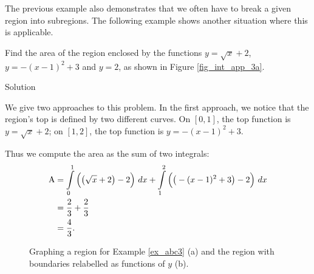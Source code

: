 The previous example also demonstrates that we often have to break a given region into subregions. The following example shows another situation where this is applicable.

\begin{example}\label{ex_abc3}
Find the area of the region enclosed by the functions $y=\sqrt{x}+2$, $y=-(x-1)^2+3$ and $y=2$, as shown in Figure \ref{fig_int_app_3a}.


\pagebreak

Solution 

We give two approaches to this problem. In the first approach, we notice that the region's top is defined by two different curves. On $[0,1]$, the top function is $y=\sqrt{x}+2$; on $[1,2]$, the top function is $y=-(x-1)^2+3$. 

Thus we compute the area as the sum of two integrals:
\begin{align*}
\text{A} &= \displaystyle\int\limits_0^1 \Big(\big(\sqrt{x}+2\big)-2\Big)\ dx + \displaystyle\int\limits_1^2 \Big(\big(-(x-1)^2+3\big)-2\Big)\ dx \\
									&= \dfrac{2}{3}+\dfrac{2}{3}\\
									&=\dfrac{4}{3}.
\end{align*}


\begin{figure}[H]
\centering
\qquad
{}
\caption{Graphing a region for Example \ref{ex_abc3} (a) and the region with boundaries relabelled as functions of $y$ (b).}
\end{figure}



\end{example}
